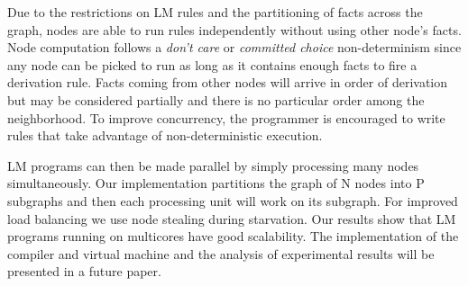 Due to the restrictions on LM rules and the partitioning of facts across the graph, nodes are able to
run rules independently without using other node's facts. Node computation follows a \emph{don't care} or \emph{committed choice} non-determinism
since any node can be picked to run as long as it contains enough facts to fire a derivation rule.
Facts coming from other nodes will arrive in order of derivation but may be considered
partially and there is no particular order among the neighborhood. To improve concurrency,
the programmer is encouraged to write rules that take advantage of non-deterministic execution.

LM programs can then be made parallel by simply processing many nodes simultaneously.
Our implementation partitions the graph of N nodes into P subgraphs and then each processing unit will work on its subgraph.
For improved load balancing we use node stealing during starvation.
Our results show that LM programs running on multicores have good scalability.
The implementation of the compiler and virtual machine and
the analysis of experimental results will be presented in a future paper.
